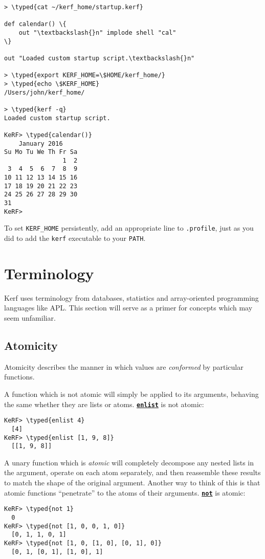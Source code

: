 \documentclass{article}
\newcommand{\typed}[1]{\textcolor{TealBlue}{#1}}
\newcommand{\primu}[2]{\hyperref[prim:#2]{\textbf{\texttt{#1}}}}
\newcommand{\prim}[1]{\primu{#1}{#1}}
\begin{document}
\begin{Verbatim}
> \typed{cat ~/kerf_home/startup.kerf}

def calendar() \{
	out "\textbackslash{}n" implode shell "cal"
\}

out "Loaded custom startup script.\textbackslash{}n"

> \typed{export KERF_HOME=\$HOME/kerf_home/}
> \typed{echo \$KERF_HOME}
/Users/john/kerf_home/

> \typed{kerf -q}
Loaded custom startup script.

KeRF> \typed{calendar()}
    January 2016
Su Mo Tu We Th Fr Sa
                1  2
 3  4  5  6  7  8  9
10 11 12 13 14 15 16
17 18 19 20 21 22 23
24 25 26 27 28 29 30
31  
KeRF>
\end{Verbatim}
To set \texttt{KERF\_HOME} persistently, add an appropriate line to \texttt{.profile}, just as you did to add the \texttt{kerf} executable to your \texttt{PATH}.

\pagebreak
\section {Terminology}
Kerf uses terminology from databases, statistics and array-oriented programming languages like APL. This section will serve as a primer for concepts which may seem unfamiliar.

\subsection{Atomicity}
Atomicity describes the manner in which values are \emph{conformed} by particular functions.

\vspace{0.5cm}

A function which is not atomic will simply be applied to its arguments, behaving the same whether they are lists or atoms. \prim{enlist} is not atomic:
\begin{Verbatim}
KeRF> \typed{enlist 4}
  [4]
KeRF> \typed{enlist [1, 9, 8]}
  [[1, 9, 8]]
\end{Verbatim}

A unary function which is \emph{atomic} will completely decompose any nested lists in the argument, operate on each atom separately, and then reassemble these results to match the shape of the original argument. Another way to think of this is that atomic functions ``penetrate'' to the atoms of their arguments. \prim{not} is atomic:
\begin{Verbatim}
KeRF> \typed{not 1}
  0
KeRF> \typed{not [1, 0, 0, 1, 0]}
  [0, 1, 1, 0, 1]
KeRF> \typed{not [1, 0, [1, 0], [0, 1], 0]}
  [0, 1, [0, 1], [1, 0], 1]
\end{Verbatim}
\end{document}
